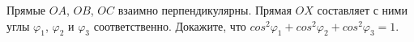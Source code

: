 Прямые $OA$, $OB$, $OC$ взаимно перпендикулярны. Прямая $OX$ составляет с ними углы $\varphi_1$, $\varphi_2$ и $\varphi_3$ соответственно. Докажите, что $cos^2\varphi_1 + cos^2\varphi_2 + cos^2\varphi_3 = 1$.